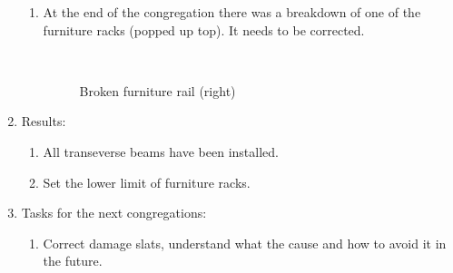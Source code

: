 \begin{enumerate}
\begin{enumerate}
      \item At the end of the congregation there was a breakdown of one of the furniture racks (popped up top). It needs to be corrected.
      
      \begin{figure}[H]
      	\begin{minipage}[h]{0.2\linewidth}
      		\center   
      	\end{minipage}
      	\begin{minipage}[h]{0.6\linewidth}
      		\caption{Broken furniture rail (right)}
      	\end{minipage}
      \end{figure}
      
    \end{enumerate}
    
	\item Results:
	\begin{enumerate}
	  \item All transeverse beams have been installed.
	  
      \item Set the lower limit of furniture racks.
      
    \end{enumerate}
    
	\item Tasks for the next congregations:
	\begin{enumerate}
	  \item Correct damage slats, understand what the cause and how to avoid it in the future.
	  
    \end{enumerate}     
\end{enumerate}
\fillpage
